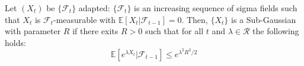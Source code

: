 \begin{define}
	Let $(X_t)$ be  $\{\mathcal{F}_t\}$ adapted: $\{\mathcal{F}_t\}$ is an increasing sequence of sigma fields such that $X_t$ is $\mathcal{F}_t$-measurable with $\mathbb{E}[X_t | \mathcal{F}_{t-1}] = 0$. Then, $\{X_t\}$ is a Sub-Gaussian with parameter $R$ if there exits $R>0$  such that for all $t$ and $\lambda \in \mathcal{R}$ the following holds:
	\begin{equation}
	\label{equ:sub_gaussian}
	\mathbb{E}\left[e^{\lambda X_t}| \mathcal{F}_{t-1}\right] \leq e^{\lambda^2R^2/2}
	\end{equation}
\end{define} 


%	

